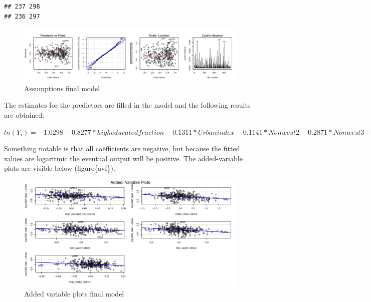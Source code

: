 \documentclass[11pt,]{article}
\begin{document}
\begin{verbatim}
## 237 298 
## 236 297
\end{verbatim}

\begin{figure}[H]

{\centering \includegraphics{Report_files/figure-latex/unnamed-chunk-13-1} 

}

\caption{\label{afm}Assumptions final model}\label{fig:unnamed-chunk-13}
\end{figure}

The estimates for the predictors are filled in the model and the
following results are obtained:

\(ln(Y_i) = -1.0298 -0.8277*high educated fraction -0.1311*Urban index -0.1141*Non west2 -0.2871*Non west3 -3.0168*Frac 60plus + \epsilon i\)

Something notable is that all coëfficients are negative, but because the
fitted values are logaritmic the eventual output will be positive. The
added-variable plots are visible below (figure\{avf\}).

\begin{figure}[H]

{\centering \includegraphics{Report_files/figure-latex/unnamed-chunk-14-1} 

}

\caption{\label{avf} Added variable plots final model}\label{fig:unnamed-chunk-14}
\end{figure}
\end{document}
